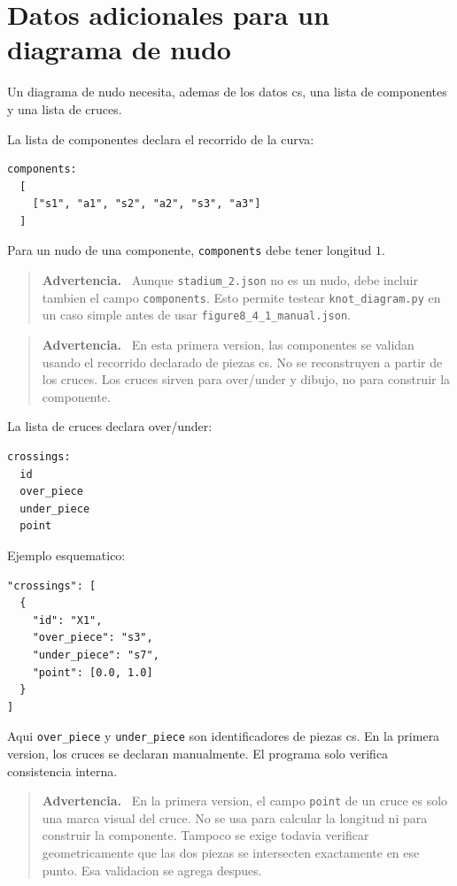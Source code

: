 \documentclass[11pt,letterpaper]{amsart}
\newenvironment{warningbox}
{\par\medskip\noindent\begin{quote}\textbf{Advertencia.}\ }
{\end{quote}\par\medskip}
\begin{document}
\section{Datos adicionales para un diagrama de nudo}

Un diagrama de nudo necesita, ademas de los datos cs, una lista de componentes y
una lista de cruces.

La lista de componentes declara el recorrido de la curva:

\begin{verbatim}
components:
  [
    ["s1", "a1", "s2", "a2", "s3", "a3"]
  ]
\end{verbatim}

Para un nudo de una componente, \texttt{components} debe tener longitud \(1\).

\begin{warningbox}
Aunque \texttt{stadium\_2.json} no es un nudo, debe incluir tambien el campo
\texttt{components}. Esto permite testear \texttt{knot\_diagram.py} en un caso
simple antes de usar \texttt{figure8\_4\_1\_manual.json}.
\end{warningbox}

\begin{warningbox}
En esta primera version, las componentes se validan usando el recorrido declarado
de piezas cs. No se reconstruyen a partir de los cruces. Los cruces sirven para
over/under y dibujo, no para construir la componente.
\end{warningbox}

La lista de cruces declara over/under:

\begin{verbatim}
crossings:
  id
  over_piece
  under_piece
  point
\end{verbatim}

Ejemplo esquematico:
\begin{verbatim}
"crossings": [
  {
    "id": "X1",
    "over_piece": "s3",
    "under_piece": "s7",
    "point": [0.0, 1.0]
  }
]
\end{verbatim}

Aqui \texttt{over\_piece} y \texttt{under\_piece} son identificadores de piezas
cs. En la primera version, los cruces se declaran manualmente. El programa solo
verifica consistencia interna.

\begin{warningbox}
En la primera version, el campo \texttt{point} de un cruce es solo una marca
visual del cruce. No se usa para calcular la longitud ni para construir la
componente. Tampoco se exige todavia verificar geometricamente que las dos
piezas se intersecten exactamente en ese punto. Esa validacion se agrega
despues.
\end{warningbox}
\end{document}
